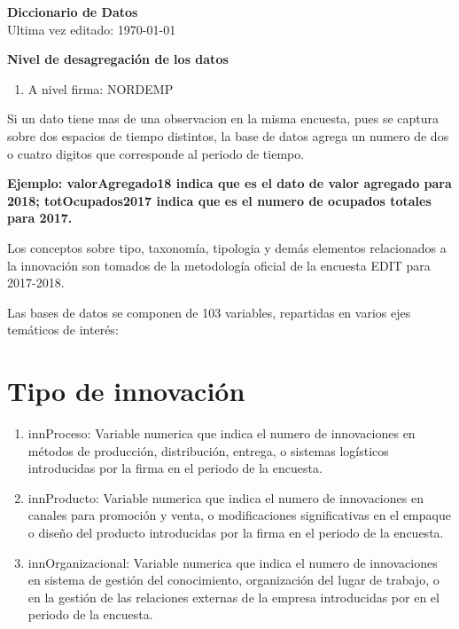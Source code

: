 \documentclass[12pt,a4paper]{article}
\begin{document}
\begin{center}
	\textbf{Diccionario de Datos} \\
	Ultima vez editado: \today
\end{center}
\vspace{10mm}

\textbf{Nivel de desagregación de los datos}
\begin{enumerate}
	\item A nivel firma: NORDEMP
\end{enumerate}

Si un dato tiene mas de una observacion en la misma encuesta, pues se captura sobre dos espacios de tiempo distintos, la base de datos agrega un numero de dos o cuatro digitos que corresponde al periodo de tiempo. 

\begin{center}
	\textbf{\textbf{Ejemplo}: valorAgregado18 indica que es el dato de valor agregado para 2018; totOcupados2017 indica que es el numero de ocupados totales para 2017.}
\end{center}

Los conceptos sobre tipo, taxonomía, tipologia y demás elementos relacionados a la innovación son tomados de la metodología oficial de la encuesta EDIT para 2017-2018.

Las bases de datos se componen de 103 variables, repartidas en varios ejes temáticos de interés:

\section{Tipo de innovación}

\begin{enumerate}
	\item innProceso: Variable numerica que indica el numero de innovaciones en métodos de producción, distribución, entrega, o sistemas logísticos introducidas por la firma en el periodo de la encuesta.
	\item innProducto: Variable numerica que indica el numero de innovaciones en canales para promoción y venta, o modificaciones significativas en el empaque o diseño del producto introducidas por la firma en el periodo de la encuesta.
	\item innOrganizacional: Variable numerica que indica el numero de innovaciones en sistema de gestión del conocimiento, organización del lugar de trabajo, o en la gestión de las relaciones externas de la empresa introducidas por  en el periodo de la encuesta.
\end{enumerate}
\end{document}
